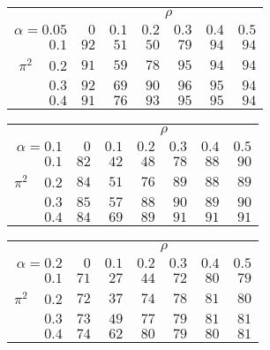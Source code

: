 \begin{tabular}{r|rrrrrr}
\hline\hline
 &\multicolumn{6}{c}{$\rho$} \\ 
 $\alpha = 0.05$ & $0$ & $0.1$ & $0.2$ & $0.3$ & $0.4$ & $0.5$ \\ 
 \hline$0.1$ & $92$ & $51$ & $50$ & $79$ & $94$ & $94$\\ 
$\pi^2\;\;\;$ $0.2$ & $91$ & $59$ & $78$ & $95$ & $94$ & $94$\\ 
$0.3$ & $92$ & $69$ & $90$ & $96$ & $95$ & $94$\\ 
$0.4$ & $91$ & $76$ & $93$ & $95$ & $95$ & $94$\\ 
 \hline 
 \end{tabular}
 
 \vspace{2em} 
 
\begin{tabular}{r|rrrrrr}
\hline\hline
 &\multicolumn{6}{c}{$\rho$} \\ 
 $\alpha = 0.1$ & $0$ & $0.1$ & $0.2$ & $0.3$ & $0.4$ & $0.5$ \\ 
 \hline$0.1$ & $82$ & $42$ & $48$ & $78$ & $88$ & $90$\\ 
$\pi^2\;\;\;$ $0.2$ & $84$ & $51$ & $76$ & $89$ & $88$ & $89$\\ 
$0.3$ & $85$ & $57$ & $88$ & $90$ & $89$ & $90$\\ 
$0.4$ & $84$ & $69$ & $89$ & $91$ & $91$ & $91$\\ 
 \hline 
 \end{tabular}
 
 \vspace{2em} 
 
\begin{tabular}{r|rrrrrr}
\hline\hline
 &\multicolumn{6}{c}{$\rho$} \\ 
 $\alpha = 0.2$ & $0$ & $0.1$ & $0.2$ & $0.3$ & $0.4$ & $0.5$ \\ 
 \hline$0.1$ & $71$ & $27$ & $44$ & $72$ & $80$ & $79$\\ 
$\pi^2\;\;\;$ $0.2$ & $72$ & $37$ & $74$ & $78$ & $81$ & $80$\\ 
$0.3$ & $73$ & $49$ & $77$ & $79$ & $81$ & $81$\\ 
$0.4$ & $74$ & $62$ & $80$ & $79$ & $80$ & $81$\\ 
 \hline 
 \end{tabular}